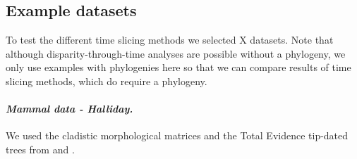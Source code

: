 \documentclass[12pt,a4paper]{article}
\begin{document}
\subsection{Example datasets}
\label{datasets}
To test the different time slicing methods we selected X datasets. 
Note that although disparity-through-time analyses are possible without a phylogeny, we only use examples with phylogenies here so that we can compare results of time slicing methods, which do require a phylogeny. 

\paragraph{\textit{Mammal data - Halliday.}}
We used the cladistic morphological matrices and the Total Evidence tip-dated trees from \citet[][103 taxa with 446 morphological characters;]{Slater2012MEE} and \citet[][102 taxa with 421 morphological characters]{beckancient2014}.
\end{document}
